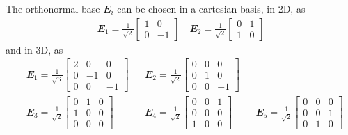 \documentclass[12pt,a4paper,fleqn]{article}
\renewcommand{\ts}[1]{\mathbfit{#1}}
\begin{document}
The orthonormal base $\ts E_i$ can be chosen in a cartesian basis, in 2D, as
\begin{align}
 \ts E_1 = \frac{1}{\sqrt{2}}\begin{bmatrix} 1 & 0\\ 0 & -1\end{bmatrix}\quad \ts E_2 = \frac{1}{\sqrt{2}}\begin{bmatrix} 0 & 1\\ 1 & 0\end{bmatrix}
\end{align}
and in 3D, as
\begin{align}
 &\ts E_1 = \frac{1}{\sqrt{6}}\begin{bmatrix} 2 & 0 & 0\\ 0 & -1 & 0\\ 0 & 0 & -1\end{bmatrix}
 &&\ts E_2 = \frac{1}{\sqrt{2}}\begin{bmatrix} 0 & 0 & 0\\ 0 & 1 & 0 \\ 0 & 0 & -1\end{bmatrix}
 &&\\
 &\ts E_3 = \frac{1}{\sqrt{2}}\begin{bmatrix} 0 & 1 & 0\\ 1 & 0 & 0 \\ 0 & 0 & 0\end{bmatrix}
 &&\ts E_4 = \frac{1}{\sqrt{2}}\begin{bmatrix} 0 & 0 & 1\\ 0 & 0 & 0 \\ 1 & 0 & 0\end{bmatrix}
 &&\ts E_5 = \frac{1}{\sqrt{2}}\begin{bmatrix} 0 & 0 & 0\\ 0 & 0 & 1 \\ 0 & 1 & 0\end{bmatrix}
\end{align}
\end{document}
